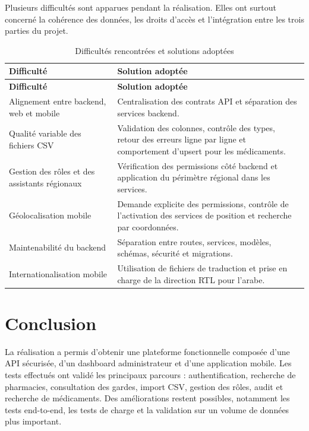 Plusieurs difficultés sont apparues pendant la réalisation. Elles ont surtout concerné la cohérence des
données, les droits d'accès et l'intégration entre les trois parties du projet.

\begin{longtable}{L{5cm}L{9cm}}
    \caption{Difficultés rencontrées et solutions adoptées}\\
    \toprule
    \textbf{Difficulté} & \textbf{Solution adoptée} \\
    \midrule
    \endfirsthead
    \toprule
    \textbf{Difficulté} & \textbf{Solution adoptée} \\
    \midrule
    \endhead
    Alignement entre backend, web et mobile & Centralisation des contrats API et séparation des services backend. \\
    Qualité variable des fichiers CSV & Validation des colonnes, contrôle des types, retour des erreurs ligne par ligne et comportement d'upsert pour les médicaments. \\
    Gestion des rôles et des assistants régionaux & Vérification des permissions côté backend et application du périmètre régional dans les services. \\
    Géolocalisation mobile & Demande explicite des permissions, contrôle de l'activation des services de position et recherche par coordonnées. \\
    Maintenabilité du backend & Séparation entre routes, services, modèles, schémas, sécurité et migrations. \\
    Internationalisation mobile & Utilisation de fichiers de traduction et prise en charge de la direction RTL pour l'arabe. \\
    \bottomrule
\end{longtable}

\section{Conclusion}

La réalisation a permis d'obtenir une plateforme fonctionnelle composée d'une API sécurisée, d'un
dashboard administrateur et d'une application mobile. Les tests effectués ont validé les principaux
parcours : authentification, recherche de pharmacies, consultation des gardes, import CSV, gestion des
rôles, audit et recherche de médicaments. Des améliorations restent possibles, notamment les tests
end-to-end, les tests de charge et la validation sur un volume de données plus important.
